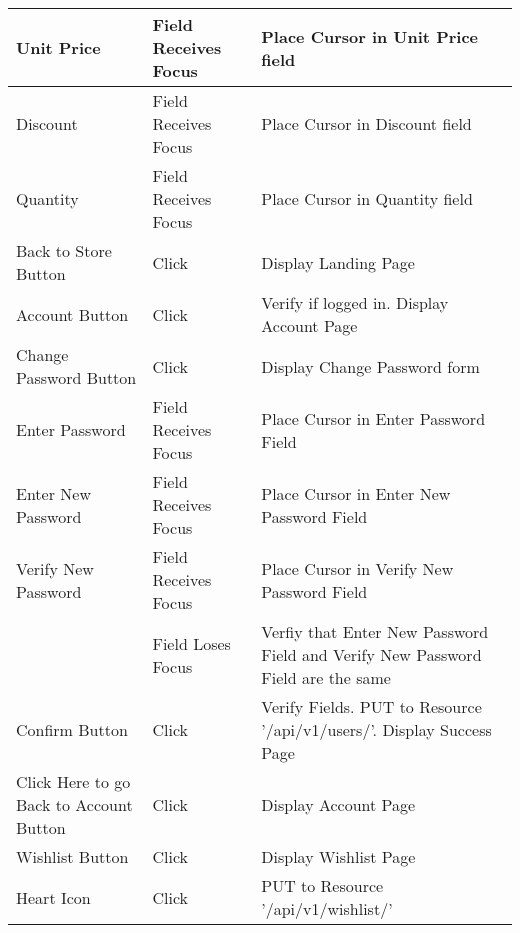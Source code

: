 \documentclass[12pt]{article}
\begin{document}
\begin{center}
	\begin{tabular}{ m{1.5in} | m{1.5in} | m{1.5in} }
	Unit Price 			& Field Receives Focus 	& Place Cursor in Unit Price field \\
	\hline
	Discount 			& Field Receives Focus 	& Place Cursor in Discount field \\
	\hline
	Quantity 			& Field Receives Focus 	& Place Cursor in Quantity field \\
	\hline
	Back to Store Button & Click 				& Display Landing Page \\
	\hline
	Account Button 		& Click 					& Verify if logged in. Display Account Page \\
	\hline
	Change Password Button & Click 				& Display Change Password form \\
	\hline
	Enter Password 		& Field Receives Focus 	& Place Cursor in Enter Password Field \\
	\hline
	Enter New Password 	& Field Receives Focus 	& Place Cursor in Enter New Password Field \\
	\hline
	Verify New Password 	& Field Receives Focus 	& Place Cursor in Verify New Password Field \\ \cline{2-3}
						& Field Loses Focus 		& Verfiy that Enter New Password Field and Verify New Password Field are the same \\
	\hline
	Confirm Button 		& Click 					& Verify Fields. PUT to Resource '/api/v1/users/'. Display Success Page \\
	\hline
	Click Here to go Back to Account Button & Click & Display Account Page \\
	\hline
	Wishlist Button 		& Click 					& Display Wishlist Page \\
	\hline
	Heart Icon 			& Click 					& PUT to Resource '/api/v1/wishlist/' \\	
	\end{tabular}
		
	\newpage	
	

\end{center}
\end{document}
